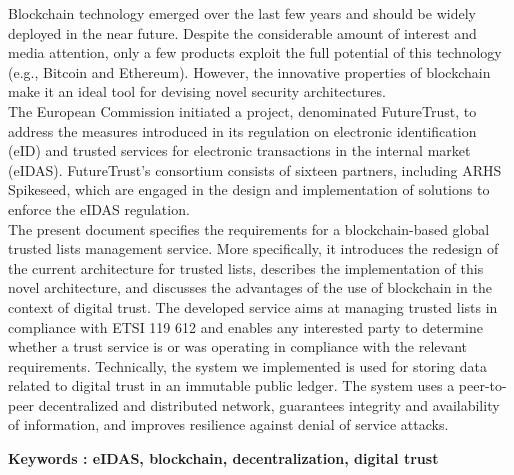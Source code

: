 \documentclass{tnreport}
\begin{document}
Blockchain technology emerged over the last few years and should be widely deployed in the near future. Despite the considerable amount of interest and media attention, only a few products exploit the full potential of this technology (e.g., Bitcoin and Ethereum). However, the innovative properties of blockchain make it an ideal tool for devising novel security architectures. 
\\
The European Commission initiated a project, denominated FutureTrust, to address the measures introduced in its regulation on electronic identification (eID) and trusted services for electronic transactions in the internal market (eIDAS). FutureTrust's consortium consists of sixteen partners, including ARHS Spikeseed, which are engaged in the design and implementation of solutions to enforce the eIDAS regulation. 
\\
The present document specifies the requirements for a blockchain-based global trusted lists management service. More specifically, it introduces the redesign of the current architecture for trusted lists, describes the implementation of this novel architecture, and discusses the advantages of the use of blockchain in the context of digital trust. The developed service aims at managing trusted lists in compliance with ETSI 119 612 and enables any interested party to determine whether a trust service is or was operating in compliance with the relevant requirements. Technically, the system we implemented is used for storing data related to digital trust in an immutable public ledger. The system uses a peer-to-peer decentralized and distributed network, guarantees integrity and availability of information, and improves resilience against denial of service attacks.

{\bf Keywords : eIDAS, blockchain, decentralization, digital trust}
\end{document}
